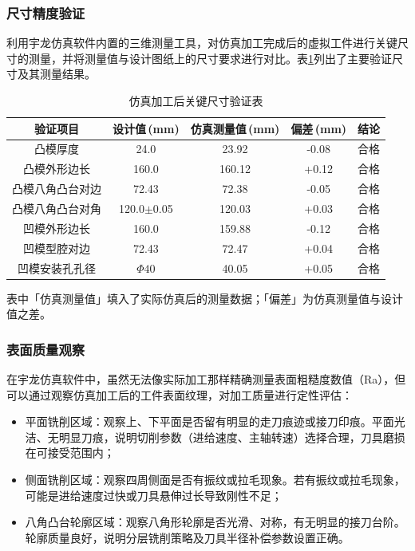\documentclass{xautCADreport}
\begin{document}
\subsubsection{尺寸精度验证}

利用宇龙仿真软件内置的三维测量工具，对仿真加工完成后的虚拟工件进行关键尺寸的测量，并将测量值与设计图纸上的尺寸要求进行对比。表\ref{tab:sim-dim-verify}列出了主要验证尺寸及其测量结果。

\begin{table}[H]
  \centering
  \caption{仿真加工后关键尺寸验证表}
  \label{tab:sim-dim-verify}
  \begin{tabular}{ccccc}
    \toprule
    验证项目 & 设计值\,(mm) & 仿真测量值\,(mm) & 偏差\,(mm) & 结论 \\
    \midrule
    凸模厚度             & 24.0   & 23.92    & -0.08   & 合格 \\
    凸模外形边长         & 160.0  & 160.12    & +0.12   & 合格 \\
    凸模八角凸台对边   & 72.43  & 72.38    & -0.05   & 合格 \\
    凸模八角凸台对角   & 120.0$\pm$0.05 & 120.03 & +0.03 & 合格 \\
    凹模外形边长         & 160.0  & 159.88    & -0.12   & 合格 \\
    凹模型腔对边       & 72.43  & 72.47    & +0.04   & 合格 \\
    凹模安装孔孔径     & $\Phi40$ & 40.05   & +0.05   & 合格 \\
    \bottomrule
  \end{tabular}
\end{table}

表中「仿真测量值」填入了实际仿真后的测量数据；「偏差」为仿真测量值与设计值之差。

\subsubsection{表面质量观察}

在宇龙仿真软件中，虽然无法像实际加工那样精确测量表面粗糙度数值（Ra），但可以通过观察仿真加工后的工件表面纹理，对加工质量进行定性评估：

\begin{itemize}
  \item 平面铣削区域：观察上、下平面是否留有明显的走刀痕迹或接刀印痕。平面光洁、无明显刀痕，说明切削参数（进给速度、主轴转速）选择合理，刀具磨损在可接受范围内；
  \item 侧面铣削区域：观察四周侧面是否有振纹或拉毛现象。若有振纹或拉毛现象，可能是进给速度过快或刀具悬伸过长导致刚性不足；
  \item 八角凸台轮廓区域：观察八角形轮廓是否光滑、对称，有无明显的接刀台阶。轮廓质量良好，说明分层铣削策略及刀具半径补偿参数设置正确。
\end{itemize}
\end{document}
